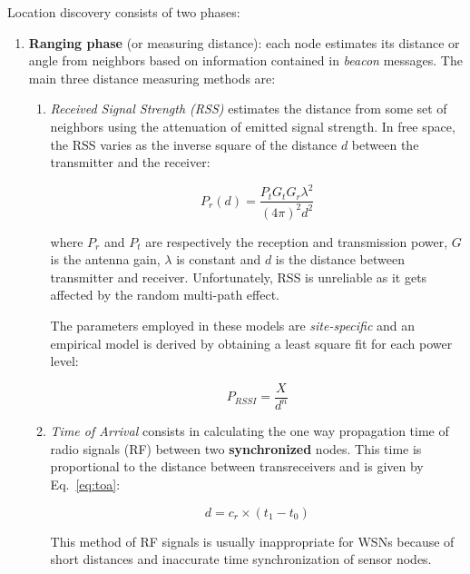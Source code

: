 \documentclass[a4paper,12pt]{article}
\begin{document}
Location discovery consists of two phases:
\begin{enumerate}
  \item \textbf{Ranging phase} (or measuring distance): each node estimates its distance or angle from neighbors based on information contained in \textit{beacon} messages.
  The main three distance measuring methods are:

  \begin{enumerate}[label=(\roman*)]
    \item \textit{Received Signal Strength (RSS)} estimates the distance from some set of neighbors using the attenuation of emitted signal strength. In free space, the RSS varies as the inverse square of the distance $d$ between the transmitter and the receiver:

    \begin{equation}
    P_r(d) = \frac{P_t G_t G_r \lambda^2}{(4\pi)^2 d^2}
    \end{equation}

    where $ P_r $ and $ P_t $ are respectively the reception and transmission power, $ G $ is the antenna gain, $ \lambda $ is constant and $ d $ is the distance between transmitter and receiver. Unfortunately, RSS is unreliable as it gets affected by the random multi-path effect.

    The parameters employed in these models are \textit{site-specific} and an empirical model is derived by obtaining a least square fit for each power level:

    \begin{equation}
    P_{RSSI} = \frac{X}{d^n}
    \end{equation}

    \item \textit{Time of Arrival} consists in calculating the one way propagation time of radio signals (RF) between two \textbf{synchronized} nodes. This time is proportional to the distance between transreceivers and is given by Eq.~\ref{eq:toa}:

    \begin{equation}
    d = c_r \times (t_1 - t_0)
    \label{eq:toa}
    \end{equation}

    This method of RF signals is usually inappropriate for WSNs because of short distances and inaccurate time synchronization of sensor nodes.


\end{enumerate}
\end{enumerate}
\end{document}

